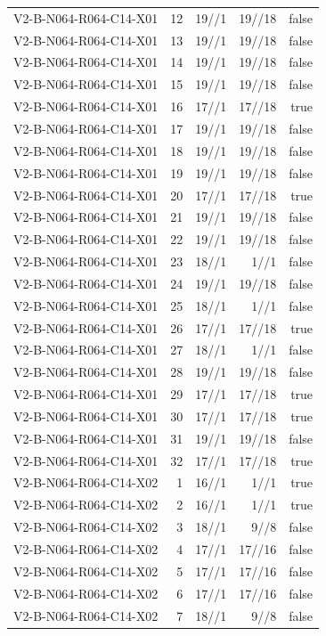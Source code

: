 {\begin{longtable}{lrrrr}
V2-B-N064-R064-C14-X01 & 12 & 19//1 & 19//18 & false \\
V2-B-N064-R064-C14-X01 & 13 & 19//1 & 19//18 & false \\
V2-B-N064-R064-C14-X01 & 14 & 19//1 & 19//18 & false \\
V2-B-N064-R064-C14-X01 & 15 & 19//1 & 19//18 & false \\
V2-B-N064-R064-C14-X01 & 16 & 17//1 & 17//18 & true \\
V2-B-N064-R064-C14-X01 & 17 & 19//1 & 19//18 & false \\
V2-B-N064-R064-C14-X01 & 18 & 19//1 & 19//18 & false \\
V2-B-N064-R064-C14-X01 & 19 & 19//1 & 19//18 & false \\
V2-B-N064-R064-C14-X01 & 20 & 17//1 & 17//18 & true \\
V2-B-N064-R064-C14-X01 & 21 & 19//1 & 19//18 & false \\
V2-B-N064-R064-C14-X01 & 22 & 19//1 & 19//18 & false \\
V2-B-N064-R064-C14-X01 & 23 & 18//1 & 1//1 & false \\
V2-B-N064-R064-C14-X01 & 24 & 19//1 & 19//18 & false \\
V2-B-N064-R064-C14-X01 & 25 & 18//1 & 1//1 & false \\
V2-B-N064-R064-C14-X01 & 26 & 17//1 & 17//18 & true \\
V2-B-N064-R064-C14-X01 & 27 & 18//1 & 1//1 & false \\
V2-B-N064-R064-C14-X01 & 28 & 19//1 & 19//18 & false \\
V2-B-N064-R064-C14-X01 & 29 & 17//1 & 17//18 & true \\
V2-B-N064-R064-C14-X01 & 30 & 17//1 & 17//18 & true \\
V2-B-N064-R064-C14-X01 & 31 & 19//1 & 19//18 & false \\
V2-B-N064-R064-C14-X01 & 32 & 17//1 & 17//18 & true \\
V2-B-N064-R064-C14-X02 & 1 & 16//1 & 1//1 & true \\
V2-B-N064-R064-C14-X02 & 2 & 16//1 & 1//1 & true \\
V2-B-N064-R064-C14-X02 & 3 & 18//1 & 9//8 & false \\
V2-B-N064-R064-C14-X02 & 4 & 17//1 & 17//16 & false \\
V2-B-N064-R064-C14-X02 & 5 & 17//1 & 17//16 & false \\
V2-B-N064-R064-C14-X02 & 6 & 17//1 & 17//16 & false \\
V2-B-N064-R064-C14-X02 & 7 & 18//1 & 9//8 & false \\

\end{longtable}}
